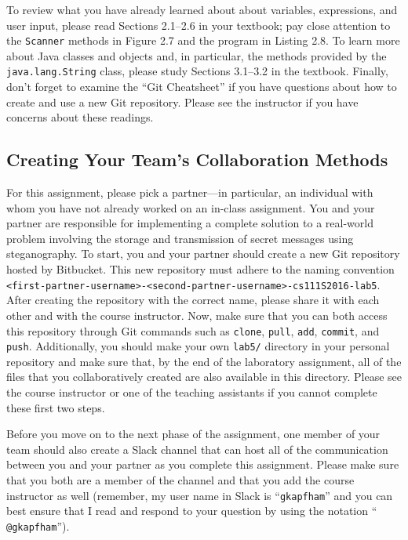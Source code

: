 To review what you have already learned about about variables, expressions, and user input, please read Sections
2.1--2.6 in your textbook; pay close attention to the {\tt Scanner} methods in Figure 2.7 and the program in Listing
2.8. To learn more about Java classes and objects and, in particular, the methods provided by the {\tt java.lang.String}
class, please study Sections 3.1--3.2 in the textbook. Finally, don't forget to examine the ``Git Cheatsheet'' if you
have questions about how to create and use a new Git repository. Please see the instructor if you have concerns about
these readings.

\vspace{-0.05in}
\subsection*{Creating Your Team's Collaboration Methods}
\vspace{-0.05in}

For this assignment, please pick a partner---in particular, an individual with whom you have not already worked on an
in-class assignment. You and your partner are responsible for implementing a complete solution to a real-world problem
involving the storage and transmission of secret messages using steganography. To start, you and your partner should
create a new Git repository hosted by Bitbucket. This new repository must adhere to the naming convention {\tt
<first-partner-username>-<second-partner-username>-cs111S2016-lab5}. After creating the repository with the correct
name, please share it with each other and with the course instructor. Now, make sure that you can both access this
repository through Git commands such as {\tt clone}, {\tt pull}, {\tt add}, {\tt commit}, and {\tt push}. Additionally,
you should make your own {\tt lab5/} directory in your personal repository and make sure that, by the end of the
laboratory assignment, all of the files that you collaboratively created are also available in this directory. Please
see the course instructor or one of the teaching assistants if you cannot complete these first two steps.

Before you move on to the next phase of the assignment, one member of your team should also create a Slack channel that
can host all of the communication between you and your partner as you complete this assignment. Please make sure that
you both are a member of the channel and that you add the course instructor as well (remember, my user name in Slack is
``{\tt gkapfham}'' and you can best ensure that I read and respond to your question by using the notation ``{\tt
@gkapfham}'').

